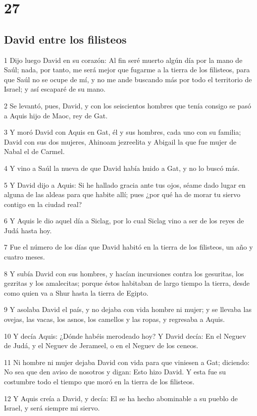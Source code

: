 {\chapter{27}

\section*{David entre los filisteos}

\par 1 Dijo luego David en su corazón: Al fin seré muerto algún día por la mano de Saúl; nada, por tanto, me será mejor que fugarme a la tierra de los filisteos, para que Saúl no se ocupe de mí, y no me ande buscando más por todo el territorio de Israel; y así escaparé de su mano.
\par 2 Se levantó, pues, David, y con los seiscientos hombres que tenía consigo se pasó a Aquis hijo de Maoc, rey de Gat.
\par 3 Y moró David con Aquis en Gat, él y sus hombres, cada uno con su familia; David con sus dos mujeres, Ahinoam jezreelita y Abigail la que fue mujer de Nabal el de Carmel.
\par 4 Y vino a Saúl la nueva de que David había huido a Gat, y no lo buscó más.
\par 5 Y David dijo a Aquis: Si he hallado gracia ante tus ojos, séame dado lugar en alguna de las aldeas para que habite allí; pues ¿por qué ha de morar tu siervo contigo en la ciudad real?
\par 6 Y Aquis le dio aquel día a Siclag, por lo cual Siclag vino a ser de los reyes de Judá hasta hoy.
\par 7 Fue el número de los días que David habitó en la tierra de los filisteos, un año y cuatro meses.
\par 8 Y subía David con sus hombres, y hacían incursiones contra los gesuritas, los gezritas y los amalecitas; porque éstos habitaban de largo tiempo la tierra, desde como quien va a Shur hasta la tierra de Egipto.
\par 9 Y asolaba David el país, y no dejaba con vida hombre ni mujer; y se llevaba las ovejas, las vacas, los asnos, los camellos y las ropas, y regresaba a Aquis.
\par 10 Y decía Aquis: ¿Dónde habéis merodeado hoy? Y David decía: En el Neguev de Judá, y el Neguev de Jerameel, o en el Neguev de los ceneos.
\par 11 Ni hombre ni mujer dejaba David con vida para que viniesen a Gat; diciendo: No sea que den aviso de nosotros y digan: Esto hizo David. Y esta fue su costumbre todo el tiempo que moró en la tierra de los filisteos.
\par 12 Y Aquis creía a David, y decía: El se ha hecho abominable a su pueblo de Israel, y será siempre mi siervo.

}
